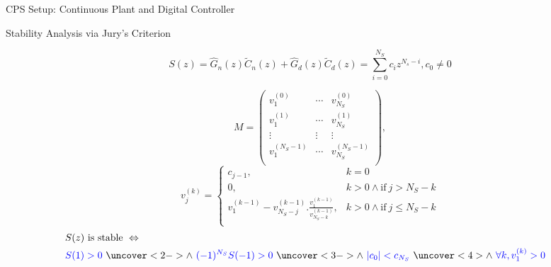 \documentclass{beamer}
\begin{document}
\begin{frame}[fragile]{CPS Setup: Continuous Plant and Digital Controller}




\end{frame}

\begin{frame}{Stability Analysis via Jury's Criterion}

\begin{equation*}
S(z) = \hat{G}_n(z) \tilde{C}_n(z)+\hat{G}_d(z) \tilde{C}_d(z) = \sum_{i=0}^{N_S} c_iz^{N_s-i}, c_0 \neq 0 
\end{equation*}

$$
M=\left( 
\begin{array}{ccc}
v^{(0)}_{1} &\cdots & v^{(0)}_{N_S}\\
v^{(1)}_{1} &\cdots&  v^{(1)}_{N_S}\\
\vdots&\vdots&\vdots\\
v^{(N_S-1)}_{1} &\cdots&  v^{(N_S-1)}_{N_S}\\
\end{array}
\right), $$
%
$$
v_{j}^{(k)}=\left\{
\begin{array}{ll}
c_{j-1}, & k=0\\
0,&k>0 \wedge \mbox{if}~j>N_S-k\\
v_{1}^{(k-1)}-v_{N_S-j}^{(k-1)} . \frac{v_{1}^{(k-1)}}{v_{N_S-k}^{(k-1)}}, &k>0 \wedge  \mbox{if}~j\leq N_S-k\\
\end{array}
\right.
$$
%
\begin{eqnarray*}
&S(z) \text{ is stable } \Leftrightarrow& \\ 
&\textcolor{blue}{S(1) > 0}\ \uncover<2->{\wedge\ \textcolor{blue}{(-1)^{N_S} S(-1) > 0}}\ \uncover<3->{\wedge\ \textcolor{blue}{|c_0| < c_{N_S}}}\ \uncover<4>{\wedge\ \textcolor{blue}{\forall k, v_1^{(k)} > 0}}&
\end{eqnarray*}

\end{frame}
\end{document}
